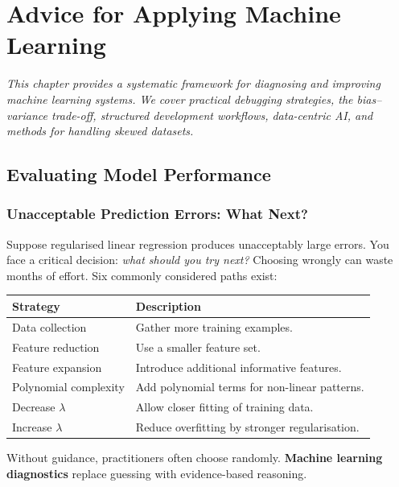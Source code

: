 \chapter{Advice for Applying Machine Learning}

\textit{This chapter provides a systematic framework for diagnosing and
improving machine learning systems. We cover practical debugging strategies,
the bias--variance trade-off, structured development workflows, data-centric
AI, and methods for handling skewed datasets.}

\section{Evaluating Model Performance}

\subsection{Unacceptable Prediction Errors: What Next?}

Suppose regularised linear regression produces unacceptably large errors.
You face a critical decision: \emph{what should you try next?} Choosing
wrongly can waste months of effort. Six commonly considered paths exist:

\begin{center}
\begin{tabular}{lp{9cm}}
\toprule
\textbf{Strategy} & \textbf{Description}\\
\midrule
Data collection      & Gather more training examples.\\
Feature reduction    & Use a smaller feature set.\\
Feature expansion    & Introduce additional informative features.\\
Polynomial complexity& Add polynomial terms for non-linear patterns.\\
Decrease $\lambda$   & Allow closer fitting of training data.\\
Increase $\lambda$   & Reduce overfitting by stronger regularisation.\\
\bottomrule
\end{tabular}
\end{center}

Without guidance, practitioners often choose randomly. \textbf{Machine
learning diagnostics} replace guessing with evidence-based reasoning.

